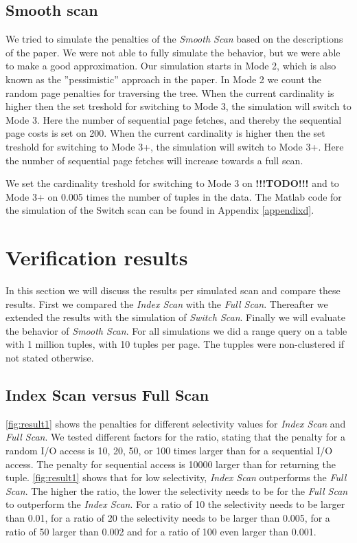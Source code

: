 \documentclass[a4paper,11pt,twoside]{article}
\begin{document}
\subsection{Smooth scan}
We tried to simulate the penalties of the \textit{Smooth Scan} based on the descriptions of the paper. We were not able to fully simulate the behavior, but we were able to make a good approximation. Our simulation starts in Mode 2, which is also known as the ''pessimistic'' approach in the paper. In Mode 2 we count the random page penalties for traversing the tree. When the current cardinality is higher then the set treshold for switching to Mode 3, the simulation will switch to Mode 3. Here the number of sequential page fetches, and thereby the sequential page costs is set on 200. When the current cardinality is higher then the set treshold for switching to Mode 3+, the simulation will switch to Mode 3+. Here the number of sequential page fetches will increase towards a full scan.

We set the cardinality treshold for switching to Mode 3 on \textbf{!!!TODO!!!} and to Mode 3+ on 0.005 times the number of tuples in the data. The Matlab code for the simulation of the Switch scan can be found in Appendix \ref{appendixd}.


\section{Verification results}
In this section we will discuss the results per simulated scan and compare these results. First we compared the \textit{Index Scan} with the \textit{Full Scan}. Thereafter we extended the results with the simulation of \textit{Switch Scan}. Finally we will evaluate the behavior of \textit{Smooth Scan}. For all simulations  we did a range query on a table with 1 million tuples, with 10 tuples per page. The tupples were non-clustered if not stated otherwise. \\

\subsection{Index Scan versus Full Scan}
\autoref{fig:result1} shows the penalties for different selectivity values for \textit{Index Scan} and \textit{Full Scan}. We tested different factors for the ratio, stating that the penalty for a random I/O access is 10, 20, 50, or 100 times larger than for a sequential I/O access. The penalty for sequential access is 10000 larger than for returning the tuple. \autoref{fig:result1} shows that for low selectivity, \textit{Index Scan} outperforms the \textit{Full Scan}. The higher the ratio, the lower the selectivity needs to be for the \textit{Full Scan} to outperform the \textit{Index Scan}. For a ratio of 10 the selectivity needs to be larger than 0.01, for a ratio of 20 the selectivity needs to be larger than  0.005, for a ratio of 50 larger than 0.002 and for a ratio of 100 even larger than 0.001.
\end{document}
